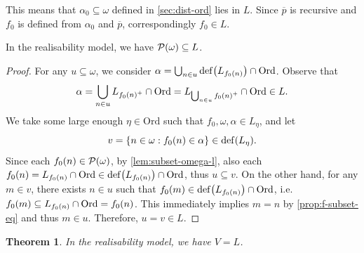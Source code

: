 \documentclass[preprint]{elsarticle}
\theoremstyle{plain}
\newtheorem{theorem}{Theorem}
\newcommand{\Ord}{\mathrm{Ord}}
\DeclareMathOperator{\dd}{def}
\begin{document}
This means that $\alpha_0 \subseteq \omega$ defined in \autoref{sec:dist-ord} lies in $L$. Since $\overline{p}$ is recursive and $f_0$ is defined from $\alpha_0$ and $\overline{p}$, correspondingly $f_0 \in L$.

\begin{proposition}
  \label{prop:omega-power-in-l}
  In the realisability model, we have $\mathcal{P}\mleft(\omega\mright) \subseteq L$.
\end{proposition}

\begin{proof}
  For any $u \subseteq \omega$, we consider $\alpha = \bigcup_{n \in u} \dd\mleft(L_{f_0\mleft(n\mright)}\mright) \cap \Ord$. Observe that
  \[\alpha = \bigcup_{n \in u} L_{f_0\mleft(n\mright)^+} \cap \Ord = L_{\bigcup_{n \in u} f_0\mleft(n\mright)^+} \cap \Ord \in L.\]
  We take some large enough $\eta \in \Ord$ such that $f_0, \omega, \alpha \in L_\eta$, and let
  \[v = \left\{n \in \omega : f_0\mleft(n\mright) \in \alpha\right\} \in \dd\mleft(L_\eta\mright).\]
  Since each $f_0\mleft(n\mright) \in \mathcal{P}\mleft(\omega\mright)$, by \autoref{lem:subset-omega-l}, also each $f_0\mleft(n\mright) = L_{f_0\mleft(n\mright)} \cap \Ord \in \dd\mleft(L_{f_0\mleft(n\mright)}\mright) \cap \Ord$, thus $u \subseteq v$. On the other hand, for any $m \in v$, there exists $n \in u$ such that $f_0\mleft(m\mright) \in \dd\mleft(L_{f_0\mleft(n\mright)}\mright) \cap \Ord$, i.e.\ $f_0\mleft(m\mright) \subseteq L_{f_0\mleft(n\mright)} \cap \Ord = f_0\mleft(n\mright)$. This immediately implies $m = n$ by \autoref{prop:f-subset-eq} and thus $m \in u$. Therefore, $u = v \in L$.
\end{proof}

\begin{theorem}
  In the realisability model, we have $V = L$.
\end{theorem}
\end{document}
